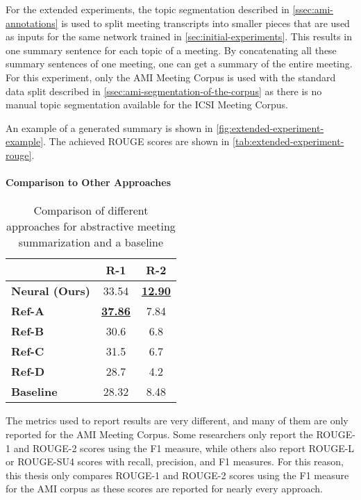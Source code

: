 For the extended experiments, the topic segmentation described in \cref{ssec:ami-annotations} is used to split meeting transcripts into smaller pieces that are used as inputs for the same network trained in \cref{sec:initial-experiments}.
This results in one summary sentence for each topic of a meeting.
By concatenating all these summary sentences of one meeting, one can get a summary of the entire meeting.
For this experiment, only the AMI Meeting Corpus is used with the standard data split described in \cref{ssec:ami-segmentation-of-the-corpus} as there is no manual topic segmentation available for the ICSI Meeting Corpus. %

An example of a generated summary is shown in \cref{fig:extended-experiment-example}.
The achieved ROUGE scores are shown in \cref{tab:extended-experiment-rouge}.

\paragraph{Comparison to Other Approaches}

\begin{table}[]
\centering
\begin{tabular}{@{}lcc@{}}
\toprule
                       & \textbf{R-1}     & \textbf{R-2}     \\ \midrule
\textbf{Neural (Ours)} & 33.54                & \underline{\textbf{12.90}} \\
\textbf{Ref-A}         & \underline{\textbf{37.86}} & 7.84                 \\
\textbf{Ref-B}         & 30.6                 & 6.8                  \\
\textbf{Ref-C}         & 31.5                 & 6.7                  \\
\textbf{Ref-D}         & 28.7                 & 4.2                  \\
\textbf{Baseline}      & 28.32                & 8.48                 \\ \bottomrule
\end{tabular}
\caption{Comparison of different approaches for abstractive meeting summarization and a baseline}
\label{tab:comparison}
\end{table}

The metrics used to report results are very different, and many of them are only reported for the AMI Meeting Corpus.
Some researchers only report the ROUGE-1 and ROUGE-2 scores using the F1 measure, while others also report ROUGE-L or ROUGE-SU4 scores with recall, precision, and F1 measures.
For this reason, this thesis only compares ROUGE-1 and ROUGE-2 scores using the F1 measure for the AMI corpus as these scores are reported for nearly every approach.

